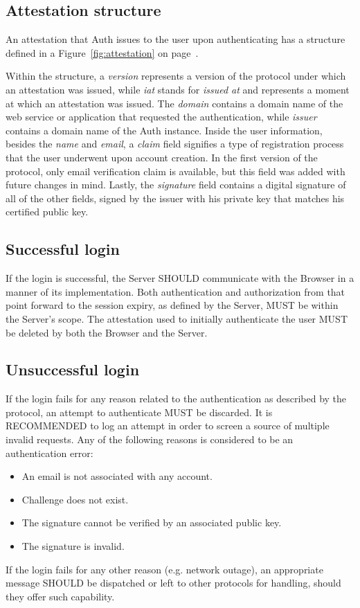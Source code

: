     \subsection{Attestation structure}
    An attestation that Auth issues to the user upon authenticating has a structure defined in a Figure~\ref{fig:attestation}
    on page~\pageref{fig:attestation}.
    
    Within the structure, a \textit{version} represents a version of the protocol under which an attestation was issued, 
    while \textit{iat} stands for \textit{issued at} and represents a moment at which an attestation was issued. The 
    \textit{domain} contains a domain name of the web service or application that requested the authentication, while 
    \textit{issuer} contains a domain name of the Auth instance. Inside the user information, besides the \textit{name}
    and \textit{email}, a \textit{claim} field signifies a type of registration process that the user underwent upon 
    account creation. In the first version of the protocol, only email verification claim is available, but this field 
    was added with future changes in mind. Lastly, the \textit{signature} field contains a digital signature of all of 
    the other fields, signed by the issuer with his private key that matches his certified public key. 

    \subsection{Successful login}
    If the login is successful, the Server SHOULD communicate with the Browser in a manner of its implementation. Both 
    authentication and authorization from that point forward to the session expiry, as defined by the Server, MUST be 
    within the Server's scope. The attestation used to initially authenticate the user MUST be deleted by both the Browser
    and the Server.

    \subsection{Unsuccessful login}
    If the login fails for any reason related to the authentication as described by the protocol, an attempt to 
    authenticate MUST be discarded. It is RECOMMENDED to log an attempt in order to screen a source of multiple invalid 
    requests. Any of the following reasons is considered to be an authentication error:
        \begin{itemize}
            \item An email is not associated with any account.
            \item Challenge does not exist.
            \item The signature cannot be verified by an associated public key.
            \item The signature is invalid.
        \end{itemize}
    If the login fails for any other reason (e.g. network outage), an appropriate message SHOULD be dispatched or left 
    to other protocols for handling, should they offer such capability.

        
